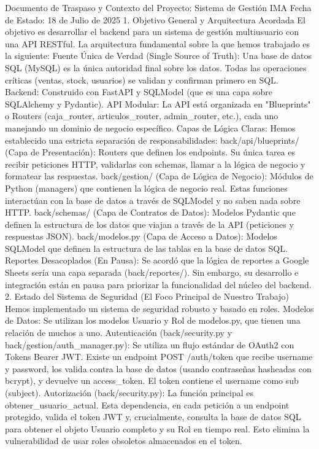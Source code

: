 Documento de Traspaso y Contexto del Proyecto: Sistema de Gestión IMA
Fecha de Estado: 18 de Julio de 2025
1. Objetivo General y Arquitectura Acordada
El objetivo es desarrollar el backend para un sistema de gestión multiusuario con una API RESTful. La arquitectura fundamental sobre la que hemos trabajado es la siguiente:
Fuente Única de Verdad (Single Source of Truth): Una base de datos SQL (MySQL) es la única autoridad final sobre los datos. Todas las operaciones críticas (ventas, stock, usuarios) se validan y confirman primero en SQL.
Backend: Construido con FastAPI y SQLModel (que es una capa sobre SQLAlchemy y Pydantic).
API Modular: La API está organizada en "Blueprints" o Routers (caja_router, articulos_router, admin_router, etc.), cada uno manejando un dominio de negocio específico.
Capas de Lógica Claras: Hemos establecido una estricta separación de responsabilidades:
back/api/blueprints/ (Capa de Presentación): Routers que definen los endpoints. Su única tarea es recibir peticiones HTTP, validarlas con schemas, llamar a la lógica de negocio y formatear las respuestas.
back/gestion/ (Capa de Lógica de Negocio): Módulos de Python (managers) que contienen la lógica de negocio real. Estas funciones interactúan con la base de datos a través de SQLModel y no saben nada sobre HTTP.
back/schemas/ (Capa de Contratos de Datos): Modelos Pydantic que definen la estructura de los datos que viajan a través de la API (peticiones y respuestas JSON).
back/modelos.py (Capa de Acceso a Datos): Modelos SQLModel que definen la estructura de las tablas en la base de datos SQL.
Reportes Desacoplados (En Pausa): Se acordó que la lógica de reportes a Google Sheets sería una capa separada (back/reportes/). Sin embargo, su desarrollo e integración están en pausa para priorizar la funcionalidad del núcleo del backend.
2. Estado del Sistema de Seguridad (El Foco Principal de Nuestro Trabajo)
Hemos implementado un sistema de seguridad robusto y basado en roles.
Modelos de Datos: Se utilizan los modelos Usuario y Rol de modelos.py, que tienen una relación de muchos a uno.
Autenticación (back/security.py y back/gestion/auth_manager.py):
Se utiliza un flujo estándar de OAuth2 con Tokens Bearer JWT.
Existe un endpoint POST /auth/token que recibe username y password, los valida contra la base de datos (usando contraseñas hasheadas con bcrypt), y devuelve un access_token.
El token contiene el username como sub (subject).
Autorización (back/security.py):
La función principal es obtener_usuario_actual. Esta dependencia, en cada petición a un endpoint protegido, valida el token JWT y, crucialmente, consulta la base de datos SQL para obtener el objeto Usuario completo y su Rol en tiempo real. Esto elimina la vulnerabilidad de usar roles obsoletos almacenados en el token.
